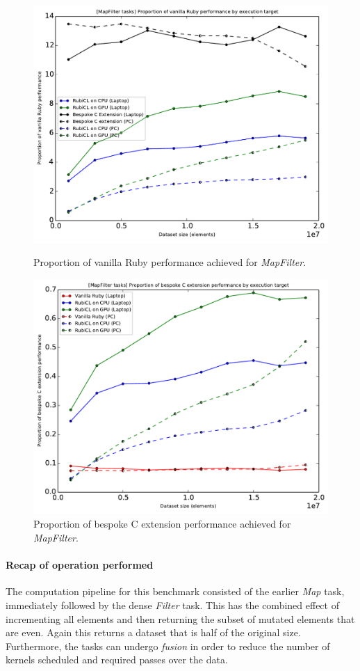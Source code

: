 \begin{figure}[H]
  \centering
  \includegraphics[width=\textwidth]{./graphing/mapfilter/prop_van.pdf}
  \caption{Proportion of vanilla Ruby performance achieved for \emph{MapFilter}.}
  \label{fig:mfilter_task_vperf_g}

  \includegraphics[width=\textwidth]{./graphing/mapfilter/prop_bes.pdf}
  \caption{Proportion of bespoke C extension performance achieved for \emph{MapFilter}.}
  \label{fig:mfilter_task_bperf_g}
\end{figure}
\paragraph*{Recap of operation performed}
The computation pipeline for this benchmark consisted of the earlier \emph{Map} task, immediately followed by the dense \emph{Filter} task.
This has the combined effect of incrementing all elements and then returning the subset of mutated elements that are even.
Again this returns a dataset that is half of the original size. Furthermore, the tasks can undergo \emph{fusion} in order to reduce the number of kernels scheduled and required passes over the data.



